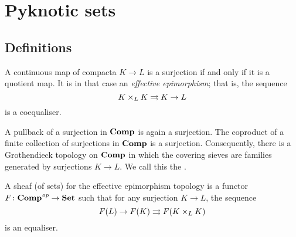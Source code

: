
\section{Pyknotic sets}

\subsection{Definitions}

\begin{cnstr}
	A continuous map of compacta $ K \to L $ is a surjection if and only if it is a quotient map.
	It is in that case an \emph{effective epimorphism};
	that is, the sequence
	\[
		K \times_L K \rightrightarrows K \to L
	\]
	is a coequaliser.

	A pullback of a surjection in $ \textbf{\textup{Comp}} $ is again a surjection.
	The coproduct of a finite collection of surjections in $ \textbf{\textup{Comp}} $ is a surjection.
	Consequently, there is a Grothendieck topology on $ \textbf{\textup{Comp}} $ in which the covering sieves are families generated by surjections $ K \to L $.
	We call this the .
\end{cnstr}

\begin{nul}
	A sheaf (of sets) for the effective epimorphism topology is a functor $ F \colon \textbf{\textup{Comp}}^{\textit{op}} \to \textbf{\textup{Set}} $ such that for any surjection $ K \to L $, the sequence
	\[
		F(L) \to F(K) \rightrightarrows F(K \times_L K)
	\]
	is an equaliser.
\end{nul}


